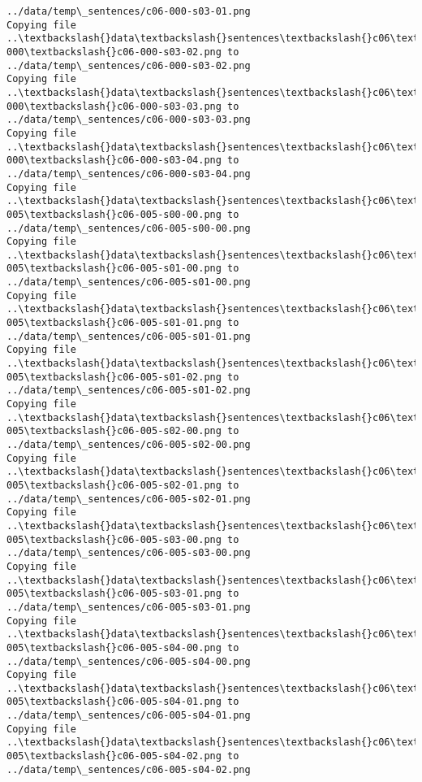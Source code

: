 \documentclass[11pt]{article}
\begin{document}
\begin{Verbatim}[commandchars=\\\{\}]
../data/temp\_sentences/c06-000-s03-01.png
Copying file ..\textbackslash{}data\textbackslash{}sentences\textbackslash{}c06\textbackslash{}c06-000\textbackslash{}c06-000-s03-02.png to
../data/temp\_sentences/c06-000-s03-02.png
Copying file ..\textbackslash{}data\textbackslash{}sentences\textbackslash{}c06\textbackslash{}c06-000\textbackslash{}c06-000-s03-03.png to
../data/temp\_sentences/c06-000-s03-03.png
Copying file ..\textbackslash{}data\textbackslash{}sentences\textbackslash{}c06\textbackslash{}c06-000\textbackslash{}c06-000-s03-04.png to
../data/temp\_sentences/c06-000-s03-04.png
Copying file ..\textbackslash{}data\textbackslash{}sentences\textbackslash{}c06\textbackslash{}c06-005\textbackslash{}c06-005-s00-00.png to
../data/temp\_sentences/c06-005-s00-00.png
Copying file ..\textbackslash{}data\textbackslash{}sentences\textbackslash{}c06\textbackslash{}c06-005\textbackslash{}c06-005-s01-00.png to
../data/temp\_sentences/c06-005-s01-00.png
Copying file ..\textbackslash{}data\textbackslash{}sentences\textbackslash{}c06\textbackslash{}c06-005\textbackslash{}c06-005-s01-01.png to
../data/temp\_sentences/c06-005-s01-01.png
Copying file ..\textbackslash{}data\textbackslash{}sentences\textbackslash{}c06\textbackslash{}c06-005\textbackslash{}c06-005-s01-02.png to
../data/temp\_sentences/c06-005-s01-02.png
Copying file ..\textbackslash{}data\textbackslash{}sentences\textbackslash{}c06\textbackslash{}c06-005\textbackslash{}c06-005-s02-00.png to
../data/temp\_sentences/c06-005-s02-00.png
Copying file ..\textbackslash{}data\textbackslash{}sentences\textbackslash{}c06\textbackslash{}c06-005\textbackslash{}c06-005-s02-01.png to
../data/temp\_sentences/c06-005-s02-01.png
Copying file ..\textbackslash{}data\textbackslash{}sentences\textbackslash{}c06\textbackslash{}c06-005\textbackslash{}c06-005-s03-00.png to
../data/temp\_sentences/c06-005-s03-00.png
Copying file ..\textbackslash{}data\textbackslash{}sentences\textbackslash{}c06\textbackslash{}c06-005\textbackslash{}c06-005-s03-01.png to
../data/temp\_sentences/c06-005-s03-01.png
Copying file ..\textbackslash{}data\textbackslash{}sentences\textbackslash{}c06\textbackslash{}c06-005\textbackslash{}c06-005-s04-00.png to
../data/temp\_sentences/c06-005-s04-00.png
Copying file ..\textbackslash{}data\textbackslash{}sentences\textbackslash{}c06\textbackslash{}c06-005\textbackslash{}c06-005-s04-01.png to
../data/temp\_sentences/c06-005-s04-01.png
Copying file ..\textbackslash{}data\textbackslash{}sentences\textbackslash{}c06\textbackslash{}c06-005\textbackslash{}c06-005-s04-02.png to
../data/temp\_sentences/c06-005-s04-02.png

\end{Verbatim}
\end{document}
